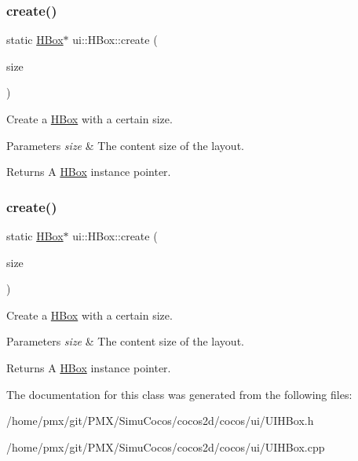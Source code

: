 \subsubsection{\texorpdfstring{create()}{create()}\hspace{0.1cm}{\footnotesize\ttfamily [3/4]}}
{\footnotesize\ttfamily static \hyperlink{classui_1_1HBox}{H\+Box}$\ast$ ui\+::\+H\+Box\+::create (\begin{DoxyParamCaption}\item[{const \hyperlink{classSize}{Size} \&}]{size }\end{DoxyParamCaption})\hspace{0.3cm}{\ttfamily [static]}}

Create a \hyperlink{classui_1_1HBox}{H\+Box} with a certain size. 
\begin{DoxyParams}{Parameters}
{\em size} & The content size of the layout. \\
\hline
\end{DoxyParams}
\begin{DoxyReturn}{Returns}
A \hyperlink{classui_1_1HBox}{H\+Box} instance pointer. 
\end{DoxyReturn}
\mbox{\label{classui_1_1HBox_a044268defeca5792a7a9a37d751ea2a7}} 
\subsubsection{\texorpdfstring{create()}{create()}\hspace{0.1cm}{\footnotesize\ttfamily [4/4]}}
{\footnotesize\ttfamily static \hyperlink{classui_1_1HBox}{H\+Box}$\ast$ ui\+::\+H\+Box\+::create (\begin{DoxyParamCaption}\item[{const \hyperlink{classSize}{Size} \&}]{size }\end{DoxyParamCaption})\hspace{0.3cm}{\ttfamily [static]}}

Create a \hyperlink{classui_1_1HBox}{H\+Box} with a certain size. 
\begin{DoxyParams}{Parameters}
{\em size} & The content size of the layout. \\
\hline
\end{DoxyParams}
\begin{DoxyReturn}{Returns}
A \hyperlink{classui_1_1HBox}{H\+Box} instance pointer. 
\end{DoxyReturn}


The documentation for this class was generated from the following files\+:\begin{DoxyCompactItemize}
\item 
/home/pmx/git/\+P\+M\+X/\+Simu\+Cocos/cocos2d/cocos/ui/U\+I\+H\+Box.\+h\item 
/home/pmx/git/\+P\+M\+X/\+Simu\+Cocos/cocos2d/cocos/ui/U\+I\+H\+Box.\+cpp\end{DoxyCompactItemize}

